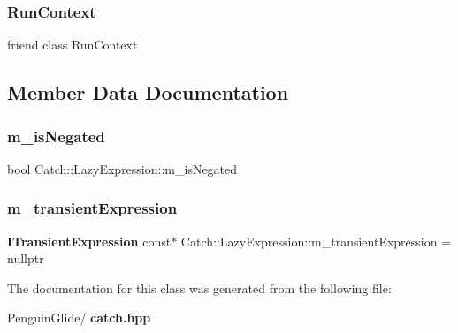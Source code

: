 \mbox{\label{class_catch_1_1_lazy_expression_af3aa096bb29a772bc534830f29a2ce7a}} 
\subsubsection{RunContext}
{\footnotesize\ttfamily friend class Run\+Context\hspace{0.3cm}{\ttfamily [friend]}}



\subsection{Member Data Documentation}
\mbox{\label{class_catch_1_1_lazy_expression_a975fdfe2bb139512024bb479d478425e}} 
\subsubsection{m\_isNegated}
{\footnotesize\ttfamily bool Catch\+::\+Lazy\+Expression\+::m\+\_\+is\+Negated\hspace{0.3cm}{\ttfamily [private]}}

\mbox{\label{class_catch_1_1_lazy_expression_a5a9ce4c2401a262c21b4e107551180bc}} 
\subsubsection{m\_transientExpression}
{\footnotesize\ttfamily \textbf{ I\+Transient\+Expression} const$\ast$ Catch\+::\+Lazy\+Expression\+::m\+\_\+transient\+Expression = nullptr\hspace{0.3cm}{\ttfamily [private]}}



The documentation for this class was generated from the following file\+:\begin{DoxyCompactItemize}
\item 
Penguin\+Glide/\textbf{ catch.\+hpp}\end{DoxyCompactItemize}
